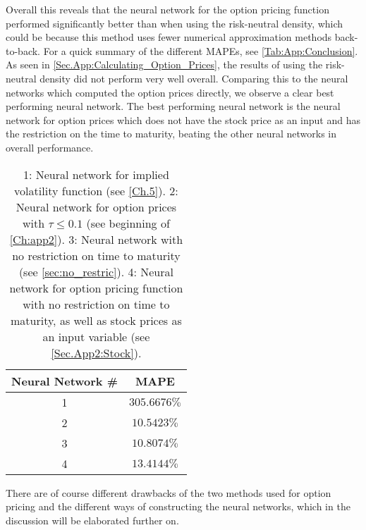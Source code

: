 Overall this reveals that the neural network for the option pricing function performed significantly better than when using the risk-neutral density, which could be because this method uses fewer numerical approximation methods back-to-back. For a quick summary of the different MAPEs, see \autoref{Tab:App:Conclusion}. As seen in \autoref{Sec.App:Calculating_Option_Prices}, the results of using the risk-neutral density did not perform very well overall. Comparing this to the neural networks which computed the option prices directly, we observe a clear best performing neural network. The best performing neural network is the neural network for option prices which does not have the stock price as an input and has the restriction on the time to maturity, beating the other neural networks in overall performance. 

\begin{table}[H]
    \centering
    \begin{tabular}{c|c}
        Neural Network \# & MAPE\\ \hline
        1 & $305.6676\%$ \\\hline
        2 & $10.5423\%$ \\\hline
        3 & $10.8074\%$  \\\hline
        4 & $13.4144\%$ 
    \end{tabular}
    \caption{1: Neural network for implied volatility function (see \autoref{Ch.5}). 2: Neural network for option prices with $\tau\leq0.1$ (see beginning of \autoref{Ch:app2}). 3: Neural network with no restriction on time to maturity (see \autoref{sec:no_restric}). 4: Neural network for option pricing function with no restriction on time to maturity, as well as stock prices as an input variable (see \autoref{Sec.App2:Stock}).}
    \label{Tab:App:Conclusion}
\end{table}

There are of course different drawbacks of the two methods used for option pricing and the different ways of constructing the neural networks, which in the discussion will be elaborated further on.